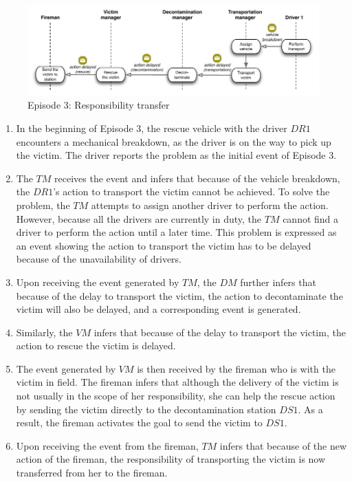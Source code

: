 \begin{figure}[htbp] %
   \centering
   \includegraphics[width=5.8in]{episode_3_interaction.pdf} 
   \caption{Episode 3: Responsibility transfer}
   \label{fig:episode_3_interaction}
\end{figure}

\begin{enumerate}
	\item In the beginning of Episode 3, the rescue vehicle with the driver $DR1$ encounters a mechanical breakdown, as the driver is on the way to pick up the victim. The driver reports the problem as the initial event of Episode 3.
	\item The $TM$ receives the event and infers that because of the vehicle breakdown, the $DR1$’s action to transport the victim cannot be achieved. To solve the problem, the $TM$ attempts to assign another driver to perform the action. However, because all the drivers are currently in duty, the $TM$ cannot find a driver to perform the action until a later time. This problem is expressed as an event showing the action to transport the victim has to be delayed because of the unavailability of drivers.
	\item Upon receiving the event generated by $TM$, the $DM$ further infers that because of the delay to transport the victim, the action to decontaminate the victim will also be delayed, and a corresponding event is generated.
	\item Similarly, the $VM$ infers that because of the delay to transport the victim, the action to rescue the victim is delayed.
	\item The event generated by $VM$ is then received by the fireman who is with the victim in field. The fireman infers that although the delivery of the victim is not usually in the scope of her responsibility, she can help the rescue action by sending the victim directly to the decontamination station $DS1$. As a result, the fireman activates the goal to send the victim to $DS1$.
	\item Upon receiving the event from the fireman, $TM$ infers that because of the new action of the fireman, the responsibility of transporting the victim is now transferred from her to the fireman.
\end{enumerate}


